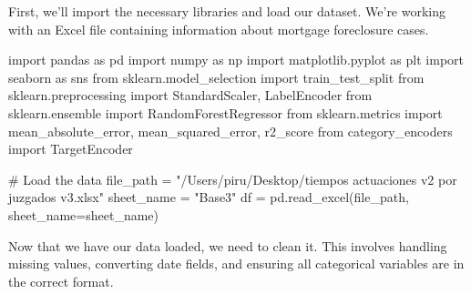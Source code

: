 \documentclass[
  letterpaper,
  DIV=11,
  numbers=noendperiod]{scrartcl}
\newenvironment{Shaded}{\begin{snugshade}}{\end{snugshade}}
\newcommand{\CommentTok}[1]{\textcolor[rgb]{0.37,0.37,0.37}{#1}}
\newcommand{\ImportTok}[1]{\textcolor[rgb]{0.00,0.46,0.62}{#1}}
\newcommand{\NormalTok}[1]{\textcolor[rgb]{0.00,0.23,0.31}{#1}}
\newcommand{\OperatorTok}[1]{\textcolor[rgb]{0.37,0.37,0.37}{#1}}
\newcommand{\StringTok}[1]{\textcolor[rgb]{0.13,0.47,0.30}{#1}}
\begin{document}
First, we'll import the necessary libraries and load our dataset. We're
working with an Excel file containing information about mortgage
foreclosure cases.

\begin{Shaded}
\begin{Highlighting}[]
\ImportTok{import}\NormalTok{ pandas }\ImportTok{as}\NormalTok{ pd}
\ImportTok{import}\NormalTok{ numpy }\ImportTok{as}\NormalTok{ np}
\ImportTok{import}\NormalTok{ matplotlib.pyplot }\ImportTok{as}\NormalTok{ plt}
\ImportTok{import}\NormalTok{ seaborn }\ImportTok{as}\NormalTok{ sns}
\ImportTok{from}\NormalTok{ sklearn.model\_selection }\ImportTok{import}\NormalTok{ train\_test\_split}
\ImportTok{from}\NormalTok{ sklearn.preprocessing }\ImportTok{import}\NormalTok{ StandardScaler, LabelEncoder}
\ImportTok{from}\NormalTok{ sklearn.ensemble }\ImportTok{import}\NormalTok{ RandomForestRegressor}
\ImportTok{from}\NormalTok{ sklearn.metrics }\ImportTok{import}\NormalTok{ mean\_absolute\_error, mean\_squared\_error, r2\_score}
\ImportTok{from}\NormalTok{ category\_encoders }\ImportTok{import}\NormalTok{ TargetEncoder}

\CommentTok{\# Load the data}
\NormalTok{file\_path }\OperatorTok{=} \StringTok{"/Users/piru/Desktop/tiempos actuaciones v2 por juzgados v3.xlsx"}
\NormalTok{sheet\_name }\OperatorTok{=} \StringTok{"Base3"}
\NormalTok{df }\OperatorTok{=}\NormalTok{ pd.read\_excel(file\_path, sheet\_name}\OperatorTok{=}\NormalTok{sheet\_name)}
\end{Highlighting}
\end{Shaded}

Now that we have our data loaded, we need to clean it. This involves
handling missing values, converting date fields, and ensuring all
categorical variables are in the correct format.
\end{document}
